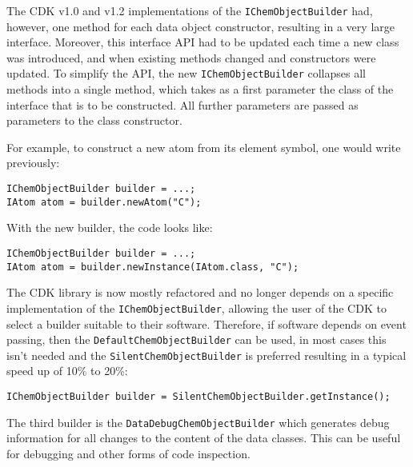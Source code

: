 \documentclass[doublespacing]{bmcart}
\begin{document}
The CDK v1.0 and v1.2 implementations of the \texttt{IChemObjectBuilder} had,
however, one method for each data object constructor, resulting in a very large
interface. Moreover, this interface API had to be updated each time a new class
was introduced, and when existing methods changed and constructors were updated.
To simplify the API, the new \texttt{IChemObjectBuilder} collapses all methods
into a single method, which takes as a first parameter the class of the
interface that is to be constructed. All further parameters are passed as
parameters to the class constructor.

For example, to construct a new atom from its element symbol, one
would write previously:

\vspace{0.2cm}
\begin{verbatim}
IChemObjectBuilder builder = ...;
IAtom atom = builder.newAtom("C");
\end{verbatim}
\vspace{0.2cm}

With the new builder, the code looks like:

\vspace{0.2cm}
\begin{verbatim}
IChemObjectBuilder builder = ...;
IAtom atom = builder.newInstance(IAtom.class, "C");
\end{verbatim}
\vspace{0.2cm}

The CDK library is now mostly refactored and no longer depends on a specific
implementation of the \texttt{IChemObjectBuilder}, allowing the user of the
CDK to select a builder suitable to their software. Therefore, if software
depends on event passing, then the \texttt{DefaultChemObjectBuilder} can be
used, in most cases this isn't needed and the \texttt{SilentChemObjectBuilder} 
is preferred resulting in a typical speed up of 10\% to 20\%:

\vspace{0.2cm}
\begin{verbatim}
IChemObjectBuilder builder = SilentChemObjectBuilder.getInstance();
\end{verbatim}
\vspace{0.2cm}

The third builder is the \texttt{DataDebugChemObjectBuilder} which generates debug
information for all changes to the content of the data classes. This
can be useful for debugging and other forms of code inspection.
\end{document}
